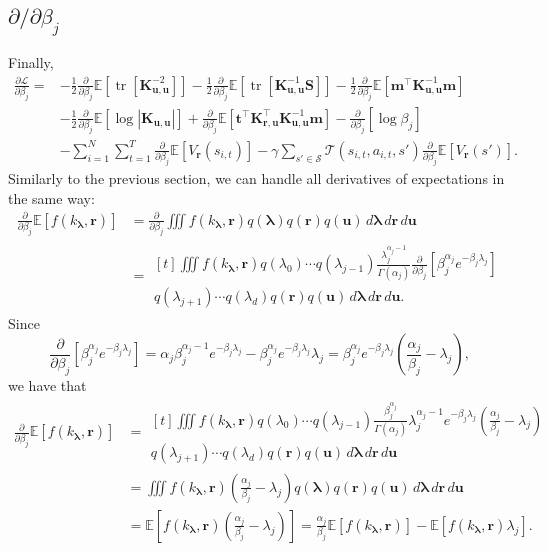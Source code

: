 \documentclass{article}
\theoremstyle{definition}
\DeclareMathOperator{\tr}{tr}
\newcommand{\Kuu}{\mathbf{K}_{\mathbf{u},\mathbf{u}}}
\newcommand{\Kru}{\mathbf{K}_{\mathbf{r},\mathbf{u}}}
\newcommand{\db}{\frac{\partial}{\partial\beta_j}}
\begin{document}
\subsection{$\partial/\partial\beta_j$}
Finally,
\[
  \begin{split}
    \frac{\partial\mathcal{L}}{\partial\beta_j} = &-
    \frac{1}{2}\db\mathbb{E}[\tr[\Kuu^{-2}]] -
    \frac{1}{2}\db\mathbb{E}[\tr[\Kuu^{-1}\mathbf{S}]] -
    \frac{1}{2}\db\mathbb{E}[\mathbf{m}^\intercal\Kuu^{-1}\mathbf{m}] \\
    &- \frac{1}{2}\db\mathbb{E}[\log|\Kuu|] +
    \db\mathbb{E}[\mathbf{t}^\intercal\Kru^\intercal\Kuu^{-1}\mathbf{m}] -
    \db[\log\beta_j] \\
    &- \sum_{i=1}^N \sum_{t=1}^T \db \mathbb{E}[V_{\mathbf{r}}(s_{i,t})] - \gamma\sum_{s'
      \in \mathcal{S}} \mathcal{T}(s_{i,t}, a_{i,t}, s')\db\mathbb{E}[V_{\mathbf{r}}(s')].
  \end{split}
\]
Similarly to the previous section, we can handle all derivatives of expectations
in the same way:
\[
  \begin{split}
    \db\mathbb{E}[f(k_{\bm\lambda}, \mathbf{r})] &= \db \iiint f(k_{\bm\lambda},
    \mathbf{r}) q(\bm\lambda) q(\mathbf{r})
    q(\mathbf{u})\,d\bm\lambda\,d\mathbf{r}\,d\mathbf{u} \\
    &= \begin{multlined}[t]
      \iiint f(k_{\bm\lambda}, \mathbf{r}) q(\lambda_0) \cdots q(\lambda_{j-1})
      \frac{\lambda_j^{\alpha_j - 1}}{\Gamma(\alpha_j)} \db [\beta_j^{\alpha_j}
      e^{-\beta_j\lambda_j}] \\
      q(\lambda_{j+1}) \cdots q(\lambda_d) q(\mathbf{r})
      q(\mathbf{u})\,d\bm\lambda\,d\mathbf{r}\,d\mathbf{u}.
    \end{multlined}
  \end{split}
\]
Since
\[ \db [\beta_j^{\alpha_j} e^{-\beta_j\lambda_j}] = \alpha_j\beta_j^{\alpha_j - 1}e^{-\beta_j\lambda_j}
  - \beta_j^{\alpha_j} e^{-\beta_j\lambda_j}\lambda_j = \beta_j^{\alpha_j}
  e^{-\beta_j\lambda_j} \left( \frac{\alpha_j}{\beta_j} - \lambda_j \right), \]
we have that
\[
  \begin{split}
    \db\mathbb{E}[f(k_{\bm\lambda}, \mathbf{r})] &= \begin{multlined}[t]
      \iiint f(k_{\bm\lambda}, \mathbf{r}) q(\lambda_0) \cdots q(\lambda_{j-1})
      \frac{\beta_j^{\alpha_j}}{\Gamma(\alpha_j)}\lambda_j^{\alpha_j -
        1}e^{-\beta_j\lambda_j} \left(\frac{\alpha_j}{\beta_j} - \lambda_j
      \right) \\
      q(\lambda_{j+1}) \cdots q(\lambda_d) q(\mathbf{r})
      q(\mathbf{u})\,d\bm\lambda\,d\mathbf{r}\,d\mathbf{u}
    \end{multlined}
    \\
    &= \iiint f(k_{\bm\lambda}, \mathbf{r}) \left(\frac{\alpha_j}{\beta_j} -
      \lambda_j \right) q(\bm\lambda) q(\mathbf{r})
    q(\mathbf{u})\,d\bm\lambda\,d\mathbf{r}\,d\mathbf{u} \\
    &= \mathbb{E} \left[ f(k_{\bm\lambda}, \mathbf{r})
      \left(\frac{\alpha_j}{\beta_j} - \lambda_j \right) \right] =
    \frac{\alpha_j}{\beta_j}\mathbb{E}[f(k_{\bm\lambda}, \mathbf{r})] -
    \mathbb{E}[f(k_{\bm\lambda}, \mathbf{r})\lambda_j].
  \end{split}
\]
\end{document}
